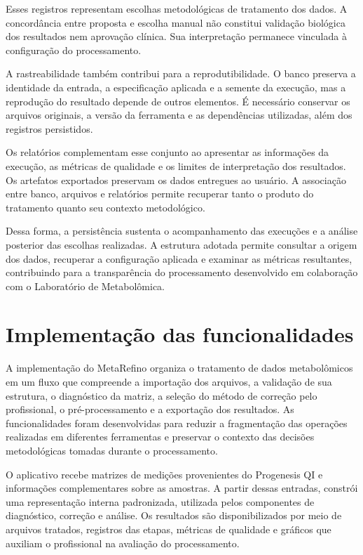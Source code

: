 Esses registros representam escolhas metodológicas de tratamento dos dados. A concordância entre proposta e escolha manual não constitui validação biológica dos resultados nem aprovação clínica. Sua interpretação permanece vinculada à configuração do processamento.

A rastreabilidade também contribui para a reprodutibilidade. O banco preserva a identidade da entrada, a especificação aplicada e a semente da execução, mas a reprodução do resultado depende de outros elementos. É necessário conservar os arquivos originais, a versão da ferramenta e as dependências utilizadas, além dos registros persistidos.

Os relatórios complementam esse conjunto ao apresentar as informações da execução, as métricas de qualidade e os limites de interpretação dos resultados. Os artefatos exportados preservam os dados entregues ao usuário. A associação entre banco, arquivos e relatórios permite recuperar tanto o produto do tratamento quanto seu contexto metodológico.

Dessa forma, a persistência sustenta o acompanhamento das execuções e a análise posterior das escolhas realizadas. A estrutura adotada permite consultar a origem dos dados, recuperar a configuração aplicada e examinar as métricas resultantes, contribuindo para a transparência do processamento desenvolvido em colaboração com o Laboratório de Metabolômica.


\section{Implementação das funcionalidades}
\label{sec:implementacao-funcionalidades}

A implementação do MetaRefino organiza o tratamento de dados metabolômicos em um fluxo que compreende a importação dos arquivos, a validação de sua estrutura, o diagnóstico da matriz, a seleção do método de correção pelo profissional, o pré-processamento e a exportação dos resultados. As funcionalidades foram desenvolvidas para reduzir a fragmentação das operações realizadas em diferentes ferramentas e preservar o contexto das decisões metodológicas tomadas durante o processamento.

O aplicativo recebe matrizes de medições provenientes do Progenesis QI e informações complementares sobre as amostras. A partir dessas entradas, constrói uma representação interna padronizada, utilizada pelos componentes de diagnóstico, correção e análise. Os resultados são disponibilizados por meio de arquivos tratados, registros das etapas, métricas de qualidade e gráficos que auxiliam o profissional na avaliação do processamento.

